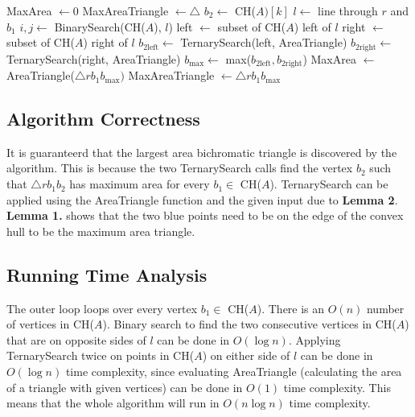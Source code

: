 \documentclass{article}
\begin{document}
  \pagebreak

  \begin{algorithmic}
      \State MaxArea $\gets 0$ 
      \State MaxAreaTriangle $\gets \triangle$ 
        \State $b_2 \gets$ CH($A)[k]$ 
        \State $l \gets$ line through $r$ and $b_1$ 
        \State $i, j \gets$ BinarySearch(CH($A$), $l$) 
        \State left $\gets$ subset of CH($A$) left of $l$
        \State right $\gets$ subset of CH($A$) right of $l$
        \State $b_{2\text{left}} \gets$ TernarySearch(left, AreaTriangle) 
        \State $b_{2\text{right}} \gets$ TernarySearch(right, AreaTriangle) 
        \State $b_{\text{max}} \gets$ max($b_{2\text{left}}, b_{2\text{right}}$) 
          \State MaxArea $\gets$ AreaTriangle($\triangle rb_1b_{\text{max}})$ 
          \State MaxAreaTriangle $\gets \triangle rb_1b_{\text{max}}$ 
        \EndIf
      \EndFor
    \EndFunction
  \end{algorithmic}

  \subsection*{Algorithm Correctness}
  It is guaranteerd that the largest area bichromatic triangle is discovered by the algorithm.
  This is because the two TernarySearch calls find the vertex $b_2$ such that $\triangle rb_1b_2$ has maximum area for every $b_1 \in$ CH($A$). 
  TernarySearch can be applied using the AreaTriangle function and the given input due to \textbf{Lemma 2}.
  \textbf{Lemma 1.} shows that the two blue points need to be on the edge of the convex hull to be the maximum area triangle.


    \subsection*{Running Time Analysis}
    The outer loop loops over every vertex $b_1 \in$ CH($A$).
    There is an $O(n)$ number of vertices in CH($A$). 
    Binary search to find the two consecutive vertices in CH($A$) that are on opposite sides of $l$ can be done in $O(\log n)$.
    Applying TernarySearch twice on points in CH($A$) on either side of $l$ can be done in $O(\log n)$ time complexity, since evaluating AreaTriangle (calculating the area of a triangle with given vertices) can be done in  $O(1)$ time complexity.
    This means that the whole algorithm will run in $O(n\log n)$ time complexity.
\end{document}
